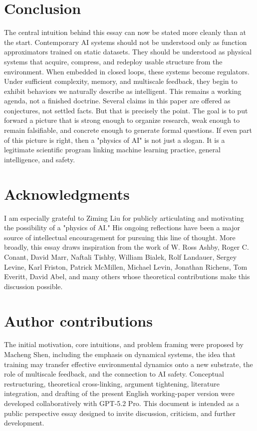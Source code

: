 \documentclass[11pt]{article}
\begin{document}
\section{Conclusion}
The central intuition behind this essay can now be stated more cleanly than at the start. Contemporary AI systems should not be understood only as function approximators trained on static datasets. They should be understood as physical systems that acquire, compress, and redeploy usable structure from the environment. When embedded in closed loops, these systems become regulators. Under sufficient complexity, memory, and multiscale feedback, they begin to exhibit behaviors we naturally describe as intelligent. This remains a working agenda, not a finished doctrine. Several claims in this paper are offered as conjectures, not settled facts. But that is precisely the point. The goal is to put forward a picture that is strong enough to organize research, weak enough to remain falsifiable, and concrete enough to generate formal questions. If even part of this picture is right, then a "physics of AI" is not just a slogan. It is a legitimate scientific program linking machine learning practice, general intelligence, and safety.
\section{Acknowledgments}
I am especially grateful to Ziming Liu for publicly articulating and motivating the possibility of a "physics of AI." His ongoing reflections have been a major source of intellectual encouragement for pursuing this line of thought. More broadly, this essay draws inspiration from the work of W. Ross Ashby, Roger C. Conant, David Marr, Naftali Tishby, William Bialek, Rolf Landauer, Sergey Levine, Karl Friston, Patrick McMillen, Michael Levin, Jonathan Richens, Tom Everitt, David Abel, and many others whose theoretical contributions make this discussion possible.
\section{Author contributions}
The initial motivation, core intuitions, and problem framing were proposed by Macheng Shen, including the emphasis on dynamical systems, the idea that training may transfer effective environmental dynamics onto a new substrate, the role of multiscale feedback, and the connection to AI safety. Conceptual restructuring, theoretical cross-linking, argument tightening, literature integration, and drafting of the present English working-paper version were developed
collaboratively with GPT-5.2 Pro. This document is intended as a public perspective essay designed to invite discussion, criticism, and further development.
\end{document}
